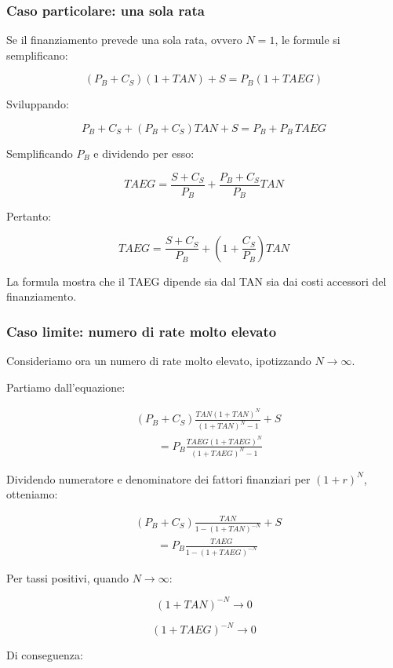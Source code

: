 \subsubsection*{Caso particolare: una sola rata}

\noindent Se il finanziamento prevede una sola rata,
ovvero $N=1$, le formule si semplificano:

\[
(P_B+C_S)(1+TAN)+S=P_B(1+TAEG)
\]

\noindent Sviluppando:

\[
P_B+C_S+(P_B+C_S)TAN+S
=
P_B+P_B\,TAEG
\]

\noindent Semplificando $P_B$ e dividendo per esso:

\[
TAEG=
\frac{S+C_S}{P_B}
+
\frac{P_B+C_S}{P_B}TAN
\]

\noindent Pertanto:

\[
\boxed{
TAEG=
\frac{S+C_S}{P_B}
+
\left(1+\frac{C_S}{P_B}\right)TAN
}
\]

\noindent La formula mostra che il TAEG dipende sia
dal TAN sia dai costi accessori del finanziamento.

\subsubsection*{Caso limite: numero di rate molto elevato}

\noindent Consideriamo ora un numero di rate molto elevato,
ipotizzando $N\to\infty$.

\medskip

\noindent Partiamo dall'equazione:

\[
\begin{aligned}
&(P_B+C_S)
\frac{TAN(1+TAN)^N}
{(1+TAN)^N-1}+S\\
&\qquad =
P_B
\frac{TAEG(1+TAEG)^N}
{(1+TAEG)^N-1}
\end{aligned}
\]

\noindent Dividendo numeratore e denominatore dei
fattori finanziari per $(1+r)^N$, otteniamo:

\[
\begin{aligned}
&(P_B+C_S)
\frac{TAN}{1-(1+TAN)^{-N}}+S\\
&\qquad =
P_B
\frac{TAEG}{1-(1+TAEG)^{-N}}
\end{aligned}
\]

\noindent Per tassi positivi, quando $N\to\infty$:

\[
(1+TAN)^{-N}\to 0
\]

\[
(1+TAEG)^{-N}\to 0
\]

\noindent Di conseguenza:

